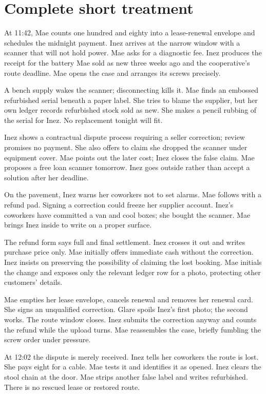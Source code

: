 \section{Complete short treatment}
At 11:42, Mae counts one hundred and eighty into a lease-renewal envelope and schedules the midnight payment. Inez arrives at the narrow window with a scanner that will not hold power. Mae asks for a diagnostic fee. Inez produces the receipt for the battery Mae sold as new three weeks ago and the cooperative's route deadline. Mae opens the case and arranges its screws precisely.

A bench supply wakes the scanner; disconnecting kills it. Mae finds an embossed refurbished serial beneath a paper label. She tries to blame the supplier, but her own ledger records refurbished stock sold as new. She makes a pencil rubbing of the serial for Inez. No replacement tonight will fit.

Inez shows a contractual dispute process requiring a seller correction; review promises no payment. She also offers to claim she dropped the scanner under equipment cover. Mae points out the later cost; Inez closes the false claim. Mae proposes a free loan scanner tomorrow. Inez goes outside rather than accept a solution after her deadline.

On the pavement, Inez warns her coworkers not to set alarms. Mae follows with a refund pad. Signing a correction could freeze her supplier account. Inez's coworkers have committed a van and cool boxes; she bought the scanner. Mae brings Inez inside to write on a proper surface.

The refund form says full and final settlement. Inez crosses it out and writes purchase price only. Mae initially offers immediate cash without the correction. Inez insists on preserving the possibility of claiming the lost booking. Mae initials the change and exposes only the relevant ledger row for a photo, protecting other customers' details.

Mae empties her lease envelope, cancels renewal and removes her renewal card. She signs an unqualified correction. Glare spoils Inez's first photo; the second works. The route window closes. Inez submits the correction anyway and counts the refund while the upload turns. Mae reassembles the case, briefly fumbling the screw order under pressure.

At 12:02 the dispute is merely received. Inez tells her coworkers the route is lost. She pays eight for a cable. Mae tests it and identifies it as opened. Inez clears the stool chain at the door. Mae strips another false label and writes refurbished. There is no rescued lease or restored route.
